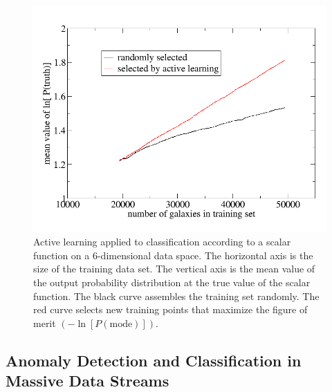 \documentclass[useAMS,usenatbib,tightenlines,11pt,preprint]{aastex}
\begin{document}
\begin{figure}
\centerline{
\includegraphics[scale=0.3]{learning_curve.png}
}
\caption{
Active learning applied to classification according to a scalar function on a
6-dimensional data space.  The horizontal axis is the size of the training data
set.  The vertical axis is the mean value of the output probability distribution
at the true value of the scalar function.  The black curve assembles the
training set randomly.  The red curve selects new training points that maximize
the figure of merit $\left(-\ln[P(\text{mode})]\right)$.
}
\label{fig:learning}
\end{figure}

\subsection{Anomaly Detection and Classification in Massive Data
 Streams}
\end{document}

